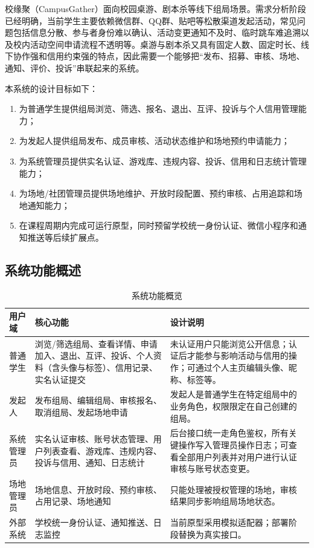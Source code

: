 \documentclass[a4paper]{article}
\begin{document}
校缘聚（CampusGather）面向校园桌游、剧本杀等线下组局场景。需求分析阶段已经明确，当前学生主要依赖微信群、QQ群、贴吧等松散渠道发起活动，常见问题包括信息分散、参与者身份难以确认、活动变更通知不及时、临时跳车难追溯以及校内活动空间申请流程不透明等。桌游与剧本杀又具有固定人数、固定时长、线下协作强和信用约束强的特点，因此需要一个能够把“发布、招募、审核、场地、通知、评价、投诉”串联起来的系统。

本系统的设计目标如下：

\begin{enumerate}
  \item 为普通学生提供组局浏览、筛选、报名、退出、互评、投诉与个人信用管理能力；
  \item 为发起人提供组局发布、成员审核、活动状态维护和场地预约申请能力；
  \item 为系统管理员提供实名认证、游戏库、违规内容、投诉、信用和日志统计管理能力；
  \item 为场地/社团管理员提供场地维护、开放时段配置、预约审核、占用追踪和场地通知能力；
  \item 在课程周期内完成可运行原型，同时预留学校统一身份认证、微信小程序和通知推送等后续扩展点。
\end{enumerate}

\subsection{系统功能概述}

\begin{table}[H]
  \centering
  \begin{tabularx}{\linewidth}{P{2.5cm} P{5.4cm} Y}
    \toprule
    用户域 & 核心功能 & 设计说明 \\
    \midrule
    普通学生 & 浏览/筛选组局、查看详情、申请加入、退出、互评、投诉、个人资料（含头像与标签）、信用记录、实名认证提交 & 未认证用户只能浏览公开信息；认证后才能参与影响活动与信用的操作；可通过个人主页编辑头像、昵称、标签等。 \\
    发起人 & 发布组局、编辑组局、审核报名、取消组局、发起场地申请 & 发起人是普通学生在特定组局中的业务角色，权限限定在自己创建的组局。 \\
    系统管理员 & 实名认证审核、账号状态管理、用户列表查看、游戏库、违规内容、投诉与信用、通知、日志统计 & 后台接口统一走角色鉴权，所有关键操作写入管理员操作日志；可查看全部用户列表并对用户进行认证审核与账号状态变更。 \\
    场地管理员 & 场地信息、开放时段、预约审核、占用记录、场地通知 & 只能处理被授权管理的场地，审核结果同步影响组局场地状态。 \\
    外部系统 & 学校统一身份认证、通知推送、日志监控 & 当前原型采用模拟适配器；部署阶段替换为真实接口。 \\
    \bottomrule
  \end{tabularx}
  \caption{系统功能概览}
\end{table}
\end{document}
